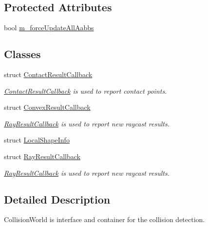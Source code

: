 \subsection*{Protected Attributes}
\begin{CompactItemize}
\item 
bool \hyperlink{classbt_collision_world_91b110fc2501b965cdcaa2a6e1d89999}{m\_\-forceUpdateAllAabbs}
\end{CompactItemize}
\subsection*{Classes}
\begin{CompactItemize}
\item 
struct \hyperlink{structbt_collision_world_1_1_contact_result_callback}{ContactResultCallback}
\begin{CompactList}\small\item\em \hyperlink{structbt_collision_world_1_1_contact_result_callback}{ContactResultCallback} is used to report contact points. \item\end{CompactList}\item 
struct \hyperlink{structbt_collision_world_1_1_convex_result_callback}{ConvexResultCallback}
\begin{CompactList}\small\item\em \hyperlink{structbt_collision_world_1_1_ray_result_callback}{RayResultCallback} is used to report new raycast results. \item\end{CompactList}\item 
struct \hyperlink{structbt_collision_world_1_1_local_shape_info}{LocalShapeInfo}
\item 
struct \hyperlink{structbt_collision_world_1_1_ray_result_callback}{RayResultCallback}
\begin{CompactList}\small\item\em \hyperlink{structbt_collision_world_1_1_ray_result_callback}{RayResultCallback} is used to report new raycast results. \item\end{CompactList}\end{CompactItemize}


\subsection{Detailed Description}
CollisionWorld is interface and container for the collision detection. 

